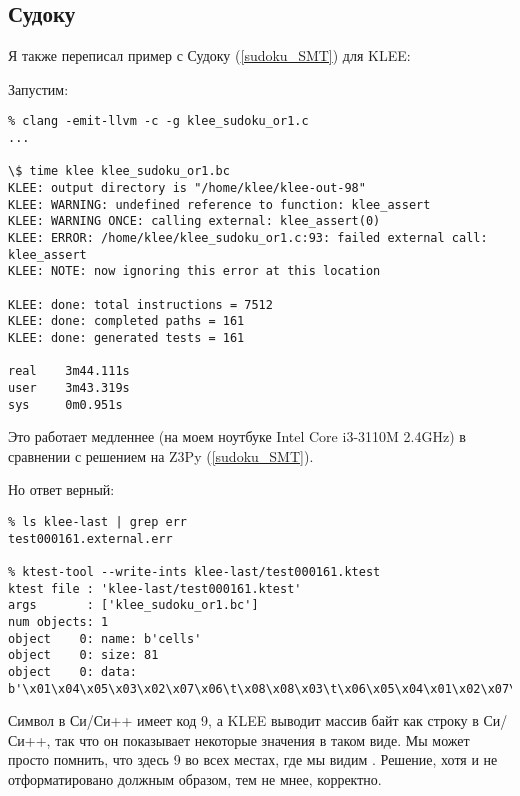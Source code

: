 \subsection{Судоку}

Я также переписал пример с Судоку (\ref{sudoku_SMT}) для KLEE:



Запустим:

\begin{lstlisting}
% clang -emit-llvm -c -g klee_sudoku_or1.c
...

\$ time klee klee_sudoku_or1.bc
KLEE: output directory is "/home/klee/klee-out-98"
KLEE: WARNING: undefined reference to function: klee_assert
KLEE: WARNING ONCE: calling external: klee_assert(0)
KLEE: ERROR: /home/klee/klee_sudoku_or1.c:93: failed external call: klee_assert
KLEE: NOTE: now ignoring this error at this location

KLEE: done: total instructions = 7512
KLEE: done: completed paths = 161
KLEE: done: generated tests = 161

real    3m44.111s
user    3m43.319s
sys     0m0.951s
\end{lstlisting}

Это работает медленнее (на моем ноутбуке Intel Core i3-3110M 2.4GHz) в сравнении с решением на Z3Py (\ref{sudoku_SMT}).

Но ответ верный:

\begin{lstlisting}
% ls klee-last | grep err
test000161.external.err

% ktest-tool --write-ints klee-last/test000161.ktest
ktest file : 'klee-last/test000161.ktest'
args       : ['klee_sudoku_or1.bc']
num objects: 1
object    0: name: b'cells'
object    0: size: 81
object    0: data: b'\x01\x04\x05\x03\x02\x07\x06\t\x08\x08\x03\t\x06\x05\x04\x01\x02\x07\x06\x07\x02\t\x01\x08\x05\x04\x03\x04\t\x06\x01\x08\x05\x03\x07\x02\x02\x01\x08\x04\x07\x03\t\x05\x06\x07\x05\x03\x02\t\x06\x04\x08\x01\x03\x06\x07\x05\x04\x02\x08\x01\t\t\x08\x04\x07\x06\x01\x02\x03\x05\x05\x02\x01\x08\x03\t\x07\x06\x04'
\end{lstlisting}

Символ  в Си/Си++ имеет код 9,
а KLEE выводит массив байт как строку в Си/Си++, так что он показывает некоторые значения в таком виде.
Мы может просто помнить, что здесь 9 во всех местах, где мы видим .
Решение, хотя и не отформатировано должным образом, тем не мнее, корректно.


